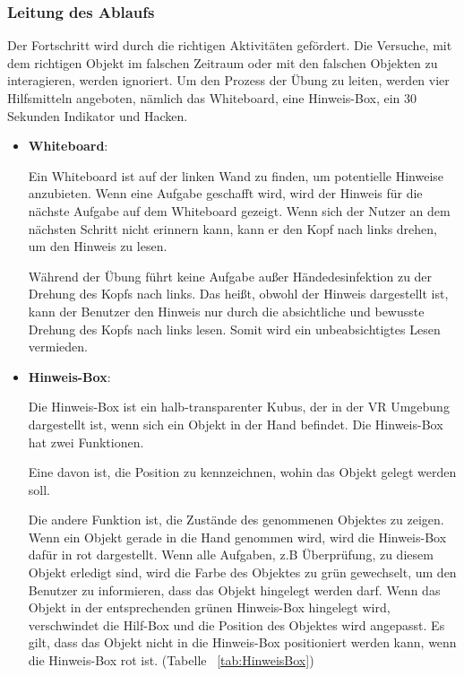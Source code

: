   \subsubsection{Leitung des Ablaufs}
  Der Fortschritt wird durch die richtigen Aktivitäten gefördert. Die Versuche, mit dem richtigen Objekt im falschen Zeitraum oder mit den falschen Objekten zu interagieren, werden ignoriert. Um den Prozess der Übung zu leiten, werden vier Hilfsmitteln angeboten, nämlich das Whiteboard, eine Hinweis-Box, ein 30 Sekunden Indikator und Hacken.
  \begin{itemize}
      \item \textbf{Whiteboard}:
      
      Ein Whiteboard ist auf der linken Wand zu finden, um potentielle Hinweise anzubieten. Wenn eine Aufgabe geschafft wird, wird der Hinweis für die nächste Aufgabe auf dem Whiteboard gezeigt. Wenn sich der Nutzer an dem nächsten Schritt nicht erinnern kann, kann er den Kopf nach links drehen, um den Hinweis zu lesen.
      
      Während der Übung führt keine Aufgabe außer Händedesinfektion zu der Drehung des Kopfs nach links. Das heißt, obwohl der Hinweis dargestellt ist, kann der Benutzer den Hinweis nur durch die absichtliche und bewusste Drehung des Kopfs nach links lesen. Somit wird ein unbeabsichtigtes Lesen vermieden.
      
      \item \textbf{Hinweis-Box}:
      
      Die Hinweis-Box ist ein halb-transparenter Kubus, der in der VR Umgebung dargestellt ist, wenn sich ein Objekt in der Hand befindet.  Die Hinweis-Box hat zwei Funktionen.
      
      Eine davon ist, die Position zu kennzeichnen, wohin das Objekt gelegt werden soll.
      
      Die andere Funktion ist, die Zustände des genommenen Objektes zu zeigen. Wenn ein Objekt gerade in die Hand genommen wird, wird die Hinweis-Box dafür in rot dargestellt. Wenn alle Aufgaben, z.B Überprüfung, zu diesem Objekt erledigt sind, wird die Farbe des Objektes zu grün gewechselt, um den Benutzer zu informieren, dass das Objekt hingelegt werden darf. Wenn das Objekt in der entsprechenden grünen Hinweis-Box hingelegt wird, verschwindet die Hilf-Box und die Position des Objektes wird angepasst. Es gilt, dass das Objekt nicht in die Hinweis-Box positioniert werden kann, wenn die Hinweis-Box rot ist. (Tabelle ~\ref{tab:HinweisBox})
      

\end{itemize}

